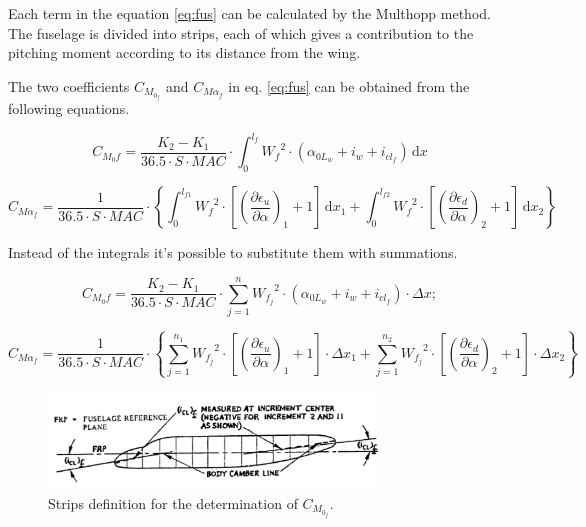 Each term in the equation \ref{eq:fus} can be calculated by the Multhopp method. %
The fuselage is divided into strips, each of which gives a contribution to the pitching moment according to its distance from the wing.

The two coefficients $C_{M_{0_f}}$  and $C_{{M\alpha}_f}$ in eq. \ref{eq:fus} can be obtained from the following equations.

\begin{equation}
C_{M_{0}f}=\dfrac{K_2-K_1}{36.5\cdot S\cdot MAC}\cdot\int_0^{l_f} \! {W_f}^2\cdot\left(\alpha_{{0L}_w}+i_w+i_{{cl}_f}\right) \, \mathrm{d}x
\end{equation}

\begin{equation}
C_{{M\alpha}_f}=\dfrac{1}{36.5\cdot S\cdot MAC}\cdot \left\{ \int_0^{l_{f1}} \! {W_f}^2\cdot \left[ {\left( \dfrac{\partial \epsilon_u}{\partial \alpha} \right)}_1 +1\right] \, \mathrm{d}x_1 + \int_0^{l_{f2}} \! {W_f}^2\cdot \left[ {\left( \dfrac{\partial \epsilon_d}{\partial \alpha} \right)}_2 +1\right] \, \mathrm{d}x_2 \right\}
\end{equation}

Instead of the integrals it’s possible to substitute them with summations.

\begin{equation}
C_{M_{0}f}=\dfrac{K_2-K_1}{36.5\cdot S\cdot MAC}\cdot\sum_{j=1}^{n} \! {W_{f_j}}^2\cdot\left(\alpha_{{0L}_w}+i_w+i_{{cl}_f}\right)\cdot \Delta x;
\end{equation}

\begin{equation}
C_{{M\alpha}_f}=\dfrac{1}{36.5\cdot S\cdot MAC}\cdot \left\{ \sum_{j=1}^{n_1} \! {W_{f_j}}^2\cdot \left[ {\left( \dfrac{\partial \epsilon_u}{\partial \alpha} \right)}_1 +1\right] \cdot \Delta x_{1} + \sum_{j=1}^{n_2} \! {W_{f_j}}^2\cdot \left[ {\left( \dfrac{\partial \epsilon_d}{\partial \alpha} \right)}_2 +1\right] \cdot \Delta x_{2} \right\}
\end{equation}


\begin{figure}[H]
\centering
\includegraphics[height=2.6cm]{Immagini/stripszero}
\caption{Strips definition for the determination of $C_{M_{0_f}}$.}
\label{wing}
\end{figure}

